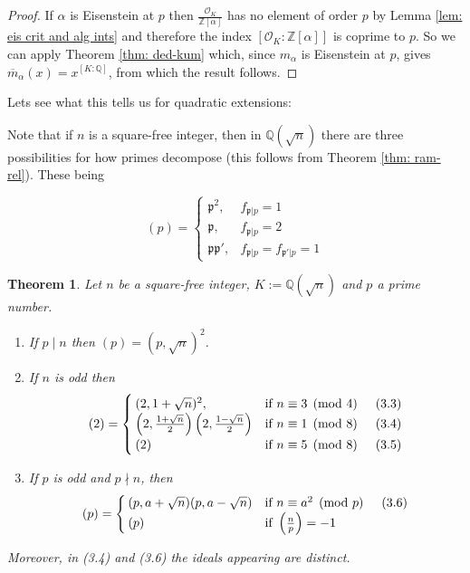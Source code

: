 \documentclass[11pt,a4paper]{report}
\theoremstyle{plain}
\newtheorem{thm}[subsection]{Theorem}
\theoremstyle{definition}
\theoremstyle{definition}
\newcommand{\ZZ}{\mathbb{Z}}
\def\QQ{\mathbb{Q}}
\def\gothp{\mathfrak{p}}
\def \a{\alpha}
\def \OO {\mathcal{O}}
\def \ov{\overline}
\begin{document}
	\begin{proof}
		If $\a$ is Eisenstein at $p$ then $\frac{\OO_K}{\ZZ[\a]}$ has no element of order $p$ by Lemma \ref{lem: eis crit and alg ints} and therefore the index $[\OO_K:\ZZ[\a]]$ is coprime to $p$. So we can apply Theorem \ref{thm: ded-kum} which, since $m_\a$ is Eisenstein at $p$, gives $\ov{m}_\a(x)=x^{[K:\QQ]}$, from which the result follows.
	\end{proof}
	Lets see what this tells us for quadratic extensions:
	
	Note that if $n$ is a square-free integer, then in $\QQ(\sqrt{n})$ there are three possibilities for how primes decompose (this follows from Theorem \ref{thm: ram-rel}). These being 
	
	\begin{equation}
		(p) = \begin{cases} 
			\gothp^2, & f_{\gothp|p}=1 \\
			\gothp, & f_{\gothp|p}=2 \\
			\gothp\gothp', & f_{\gothp|p}=f_{\gothp'|p}=1
		\end{cases}
	\end{equation}
	
	
	
	\begin{thm}\label{thm: splitting in quad ext}
		Let $n$ be a square-free integer, $K:=\QQ(\sqrt{n})$ and $p$ a prime number. 
		\begin{enumerate}
			\item[(1)] If $p\mid n$ then $(p)=(p,\sqrt{n})^2$.
			
			\item[(2)] If $n$ is odd then 
			\[
			(2)= \begin{cases}
				(2,1+\sqrt{n})^2, & \text{if } n \equiv 3 \pmod 4   \hspace{0.5cm} (3.3) \\
				\left(2,\frac{1+\sqrt{n}}{2}\right)\left(2,\frac{1-\sqrt{n}}{2}\right) & \text{if } n \equiv 1 \pmod 8 \hspace{0.5cm} (3.4)\\
				(2) &\text{if } n \equiv 5 \pmod 8 \hspace{0.5cm} (3.5)
			\end{cases}
			\]
			
			\item[(3)] If $p$ is odd and $p \nmid n$, then
			\[(p)=\begin{cases}
				(p,a+\sqrt{n})	(p,a-\sqrt{n}) & \text{if } n \equiv a^2 \pmod p  \hspace{0.5cm} (3.6)\\
				(p) &\text{if }  \left( \frac{n}{p}\right)=-1
			\end{cases}\]
			
			
		\end{enumerate}
		
		Moreover, in (3.4) and (3.6) the ideals appearing are distinct.	
	\end{thm}
	
\end{document}
